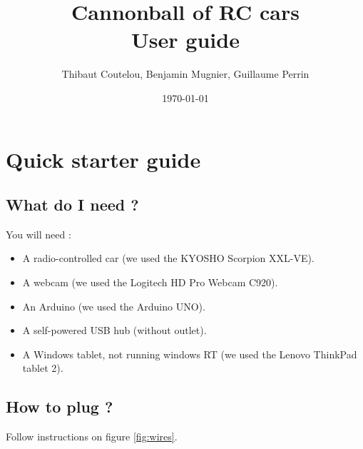 \documentclass[a4paper,11pt]{report}
\title{Cannonball of RC cars\\User guide}
\author{Thibaut Coutelou, Benjamin Mugnier, Guillaume Perrin}
\date{\today}
\begin{document}
\maketitle
\tableofcontents

\setlength{\parskip}{3mm}




\chapter{Quick starter guide}

\section{What do I need ?}

You will need :
\begin{itemize}

    \item A radio-controlled car (we used the KYOSHO Scorpion XXL-VE).

    \item A webcam (we used the Logitech HD Pro Webcam C920).

    \item An Arduino (we used the Arduino UNO).

    \item A self-powered USB hub (without outlet).

    \item A Windows tablet, not running windows RT (we used the Lenovo ThinkPad
        tablet 2).

\end{itemize}

\section{How to plug ?}

Follow instructions on figure \ref{fig:wires}.
\end{document}
